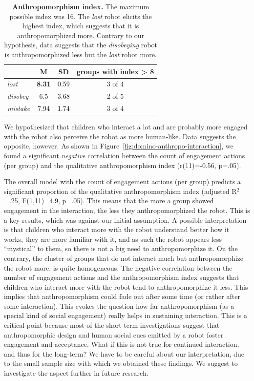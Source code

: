 \documentclass{sig-alternate}
\begin{document}
\begin{table}[ht!]
    \centering
    \footnotesize
    \begin{tabular}{lccc}
        \toprule
        & M & SD & groups with index > 8 \\
        \midrule

        \textit{lost} & \textbf{8.31} & 0.59 & 3 of 4 \\ 
        \textit{disobey} & 6.5 & 3.68 & 2 of 5 \\
        \textit{mistake} & 7.94 & 1.74 & 3 of 4 \\ 
        \bottomrule
    \end{tabular}
    \caption{\textbf{Anthropomorphism index.} The maximum possible index was 16. The
    \textit{lost} robot elicits the highest index, which suggests that it is
    anthropomorphized more. Contrary to our hypothesis, data suggests that the
    \textit{disobeying} robot is anthropomorphized less but the \textit{lost} robot
    more.}

    \label{tab:domino-anth-score}       %
\end{table}	

We hypothesized that children who interact a lot and are probably more engaged
with the robot also perceive the robot as more human-like. Data suggests the
opposite, however. As shown in Figure~\ref{fig:domino-anthropo-interaction}, we
found a significant \textit{negative} correlation between the count of
engagement actions (per group) and the qualitative anthropomorphism index
(r(11)=-0.56, p=.05).


The overall model with the count of engagement actions (per group) predicts a
significant proportion of the qualitative anthropomorphism index (adjusted
R$^2$=.25, F(1,11)=4.9, p=.05). This means that the more a group showed
engagement in the interaction, the less they anthropomorphized the robot. This
is a key results, which was against our initial assumption. A possible
interpretation is that children who interact more with the robot understand better
how it works, they are more familiar with it, and as such the robot appears less
``mystical'' to them, so there is not a big need to anthropomorphize it. On the
contrary, the cluster of groups that do not interact much but anthropomorphize
the robot more, is quite homogeneous. The negative correlation between the
number of engagement actions and the anthropomorphism index suggests that
children who interact more with the robot tend to anthropomorphize it less. This
implies that anthropomorphism could fade out after some time (or rather after
some interaction). This evokes the question how far anthropomorphism (as a
special kind of social engagement) really helps in sustaining interaction. This
is a critical point because most of the short-term investigations suggest that
anthropomorphic design and human social cues emitted by a robot foster
engagement and acceptance. What if this is not true for continued interaction,
and thus for the long-term?  We have to be careful about our interpretation, due
to the small sample size with which we obtained these findings. We suggest to
investigate the aspect further in future research.
\end{document}
